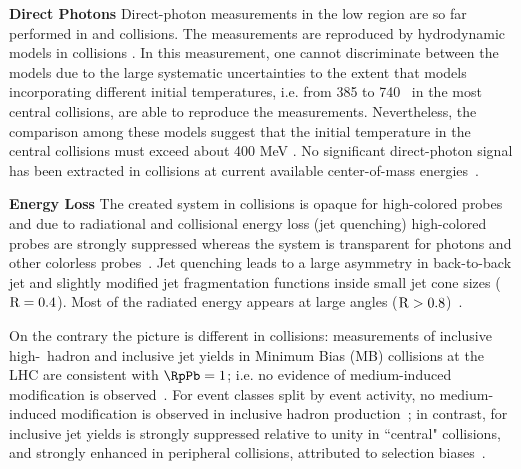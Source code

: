 \documentclass[../report.tex]{subfiles}
\begin{document}
\textbf{Direct Photons}
Direct-photon measurements in the low \pT region are so far performed in \PbPb and \pp collisions. The measurements are reproduced by hydrodynamic models in \PbPb collisions \cite{Adam:2015lda}. In this measurement, one cannot discriminate between the models due to the large systematic uncertainties to the extent that models incorporating different initial temperatures, i.e. from 385 to 740 \UMeV\ in the most central \PbPb collisions, are able to reproduce the measurements. Nevertheless, the comparison among these models suggest that the initial temperature in the central \PbPb collisions must exceed about 400 MeV \cite{Adam:2015lda}. No significant direct-photon signal has been extracted in \pp collisions at current available center-of-mass energies~\cite{Acharya:2018dqe}.

\textbf{Energy Loss}
The created system in \PbPb collisions is opaque for high-\pT colored probes and due to radiational and collisional energy loss (jet quenching) high-\pT colored probes are strongly suppressed whereas the system is transparent for photons and other colorless probes~\cite{Aamodt:2010jd,CMS:2012aa,Abelev:2012hxa,ALICE:2012ab,Aad:2014bxa,Adam:2015ewa,Aad:2015wga}. Jet quenching leads to a large asymmetry in back-to-back jet \pT and slightly modified jet fragmentation functions inside small jet cone sizes ($\rm{R} = 0.4$). Most of the radiated energy appears at large angles ($\rm{R} > 0.8$)~\cite{Aad:2010bu,Chatrchyan:2011sx,Sirunyan:2018jju,Khachatryan:2016tfj,Sirunyan:2017bsd}. 

On the contrary the picture is different in \pPb collisions: measurements of inclusive high-\pT\ hadron and inclusive jet yields in Minimum Bias (MB) \pPb collisions at the LHC are consistent with $\RpPb = 1$; i.e. no evidence of medium-induced modification is observed~\cite{Adam:2016jfp,Sirunyan:2016fcs}.  For event classes split by event activity, no medium-induced modification is observed in inclusive hadron production~\cite{Adam:2015doa, Acharya:2017okq}; in contrast, for inclusive jet yields \RpPb is strongly suppressed relative to unity in ``central" \pPb collisions, and strongly enhanced in peripheral \pPb collisions, attributed to selection biases~\cite{Acharya:2017okq}. 
\end{document}
